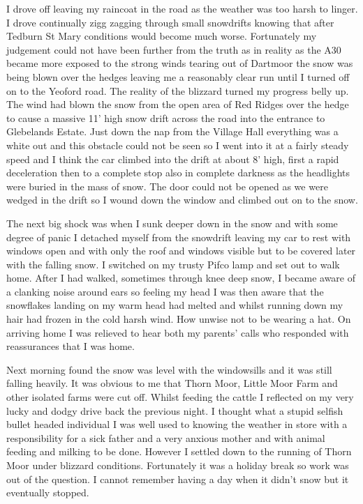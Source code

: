 I drove off leaving my raincoat in the road as the weather was too harsh to
linger. I drove continually zigg zagging through small snowdrifts knowing that
after Tedburn St Mary conditions would become much worse. Fortunately my
judgement could not have been further from the truth as in reality as the A30
became more exposed to the strong winds tearing out of Dartmoor the snow was
being blown over the hedges leaving me a reasonably clear run until I turned
off on to the Yeoford road. The reality of the blizzard turned my progress
belly up. The wind had blown the snow from the open area of Red Ridges over
the hedge to cause a massive 11' high snow drift across the road into the
entrance to Glebelands Estate. Just down the nap from the Village Hall
everything was a white out and this obstacle could not be seen so I went into
it at a fairly steady speed and I think the car climbed into the drift at about
8' high, first a rapid deceleration then to a complete stop also in complete
darkness as the headlights were buried in the mass of snow. The door could not
be opened as we were wedged in the drift so I wound down the window and climbed
out on to the snow.

The next big shock was when I sunk deeper down in the snow and with some degree
of panic I detached myself from the snowdrift leaving my car to rest with
windows open and with only the roof and windows visible but to be covered later
with the falling snow. I switched on my trusty Pifco lamp and set out to walk
home. After I had walked, sometimes through knee deep snow, I became aware of
a clanking noise around ears so feeling my head I was then aware that the
snowflakes landing on my warm head had melted and whilst running down my hair
had frozen in the cold harsh wind. How unwise not to be wearing a hat. On
arriving home I was relieved to hear both my parents' calls who responded with
reassurances that I was home.

Next morning found the snow was level with the windowsills and it was still
falling heavily. It was obvious to me that Thorn Moor, Little Moor Farm and
other isolated farms were cut off. Whilst feeding the cattle I reflected on my
very lucky and dodgy drive back the previous night. I thought what a stupid
selfish bullet headed individual I was well used to knowing the weather in
store with a responsibility for a sick father and a very anxious mother and
with animal feeding and milking to be done. However I settled down to the
running of Thorn Moor under blizzard conditions. Fortunately it was a holiday
break so work was out of the question. I cannot remember having a day when it
didn't snow but it eventually stopped.

